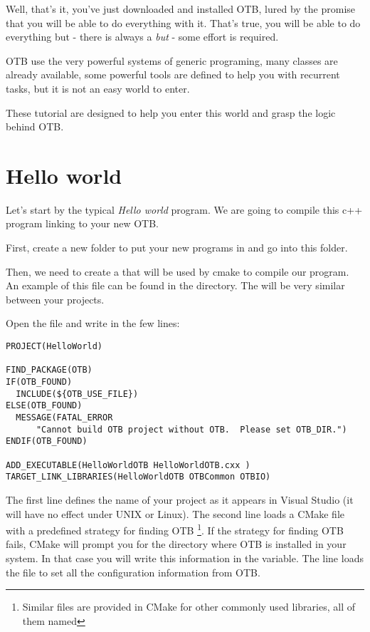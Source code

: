 

Well, that's it, you've just downloaded and installed OTB, lured by the promise that you will be able to do everything with it. That's true, you will be able to do everything but - there is always a {\em but} - some effort is required.

OTB use the very powerful systems of generic programing, many classes are already available, some powerful tools are defined to help you with recurrent tasks, but it is not an easy world to enter. 

These tutorial are designed to help you enter this world and grasp the logic behind OTB.

\section{Hello world}
\label{sec:TutorialHelloWorld}


Let's start by the typical {\em Hello world} program. We are going to compile this c++ program linking to your new OTB.

First, create a new folder to put your new programs in and go into this folder. 

Then, we need to create a  that will be used by cmake to compile our program. An example of this file can be found in the  directory. The  will be very similar between your projects.

Open the  file and write in the few lines:


\small
\begin{verbatim}
PROJECT(HelloWorld)

FIND_PACKAGE(OTB)
IF(OTB_FOUND)
  INCLUDE(${OTB_USE_FILE})
ELSE(OTB_FOUND)
  MESSAGE(FATAL_ERROR
      "Cannot build OTB project without OTB.  Please set OTB_DIR.")
ENDIF(OTB_FOUND)

ADD_EXECUTABLE(HelloWorldOTB HelloWorldOTB.cxx )
TARGET_LINK_LIBRARIES(HelloWorldOTB OTBCommon OTBIO)
\end{verbatim}

\normalsize

The first line defines the name of your project as it appears in Visual Studio (it will have no effect under UNIX or Linux). The second line loads a CMake file with a predefined strategy for finding OTB \footnote{Similar files are provided in CMake for other commonly used libraries, all of them named }. If the strategy for finding OTB fails, CMake will prompt you for the directory where OTB is installed in your system. In that case you will write this information in the  variable. The line  loads the  file to set all the configuration information from OTB.

